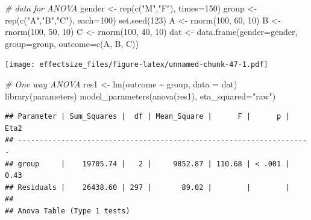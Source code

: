 \documentclass[
  ja=standard, xelatex, base=12pt]{bxjsreport}
\newenvironment{Shaded}{\begin{snugshade}}{\end{snugshade}}
\newcommand{\AttributeTok}[1]{\textcolor[rgb]{0.77,0.63,0.00}{#1}}
\newcommand{\CommentTok}[1]{\textcolor[rgb]{0.56,0.35,0.01}{\textit{#1}}}
\newcommand{\DecValTok}[1]{\textcolor[rgb]{0.00,0.00,0.81}{#1}}
\newcommand{\FunctionTok}[1]{\textcolor[rgb]{0.00,0.00,0.00}{#1}}
\newcommand{\NormalTok}[1]{#1}
\newcommand{\OtherTok}[1]{\textcolor[rgb]{0.56,0.35,0.01}{#1}}
\newcommand{\SpecialCharTok}[1]{\textcolor[rgb]{0.00,0.00,0.00}{#1}}
\newcommand{\StringTok}[1]{\textcolor[rgb]{0.31,0.60,0.02}{#1}}
\begin{document}
\begin{Shaded}
\begin{Highlighting}[]
\CommentTok{\# data for ANOVA}
\NormalTok{gender }\OtherTok{\textless{}{-}} \FunctionTok{rep}\NormalTok{(}\FunctionTok{c}\NormalTok{(}\StringTok{"M"}\NormalTok{,}\StringTok{"F"}\NormalTok{), }\AttributeTok{times=}\DecValTok{150}\NormalTok{)}
\NormalTok{group }\OtherTok{\textless{}{-}} \FunctionTok{rep}\NormalTok{(}\FunctionTok{c}\NormalTok{(}\StringTok{"A"}\NormalTok{,}\StringTok{"B"}\NormalTok{,}\StringTok{"C"}\NormalTok{), }\AttributeTok{each=}\DecValTok{100}\NormalTok{)}
\FunctionTok{set.seed}\NormalTok{(}\DecValTok{123}\NormalTok{)}
\NormalTok{A }\OtherTok{\textless{}{-}} \FunctionTok{rnorm}\NormalTok{(}\DecValTok{100}\NormalTok{, }\DecValTok{60}\NormalTok{, }\DecValTok{10}\NormalTok{)}
\NormalTok{B }\OtherTok{\textless{}{-}} \FunctionTok{rnorm}\NormalTok{(}\DecValTok{100}\NormalTok{, }\DecValTok{50}\NormalTok{, }\DecValTok{10}\NormalTok{)}
\NormalTok{C }\OtherTok{\textless{}{-}} \FunctionTok{rnorm}\NormalTok{(}\DecValTok{100}\NormalTok{, }\DecValTok{40}\NormalTok{, }\DecValTok{10}\NormalTok{)}
\NormalTok{dat }\OtherTok{\textless{}{-}} \FunctionTok{data.frame}\NormalTok{(}\AttributeTok{gender=}\NormalTok{gender, }\AttributeTok{group=}\NormalTok{group, }\AttributeTok{outcome=}\FunctionTok{c}\NormalTok{(A, B, C))}
\end{Highlighting}
\end{Shaded}

\texttt{[image: effectsize\_files/figure-latex/unnamed-chunk-47-1.pdf]}

\begin{Shaded}
\begin{Highlighting}[]
\CommentTok{\# One way ANOVA}
\NormalTok{res1 }\OtherTok{\textless{}{-}} \FunctionTok{lm}\NormalTok{(outcome }\SpecialCharTok{\textasciitilde{}}\NormalTok{ group, }\AttributeTok{data =}\NormalTok{ dat)}
\FunctionTok{library}\NormalTok{(parameters)}
\FunctionTok{model\_parameters}\NormalTok{(}\FunctionTok{anova}\NormalTok{(res1), }\AttributeTok{eta\_squared=}\StringTok{"raw"}\NormalTok{)}
\end{Highlighting}
\end{Shaded}

\begin{verbatim}
## Parameter | Sum_Squares |  df | Mean_Square |      F |      p | Eta2
## --------------------------------------------------------------------
## group     |    19705.74 |   2 |     9852.87 | 110.68 | < .001 | 0.43
## Residuals |    26438.60 | 297 |       89.02 |        |        |     
## 
## Anova Table (Type 1 tests)
\end{verbatim}
\end{document}
